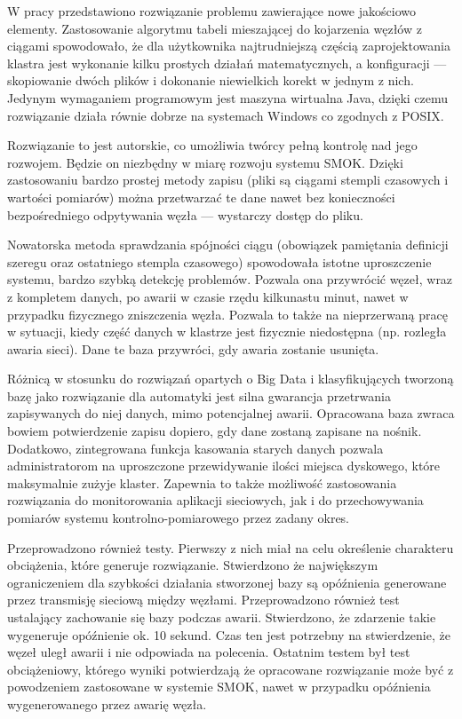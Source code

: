 \documentclass[a4paper,polish,12pt,twoside]{article}
\begin{document}
W pracy przedstawiono rozwiązanie problemu zawierające nowe jakościowo elementy. Zastosowanie algorytmu tabeli mieszającej do kojarzenia węzłów z ciągami spowodowało, że dla użytkownika najtrudniejszą częścią zaprojektowania klastra jest wykonanie kilku prostych działań matematycznych, a konfiguracji --- skopiowanie dwóch plików i dokonanie niewielkich korekt w jednym z nich. Jedynym wymaganiem programowym jest maszyna wirtualna Java, dzięki czemu rozwiązanie działa równie dobrze na systemach Windows co zgodnych z POSIX.

Rozwiązanie to jest autorskie, co umożliwia twórcy pełną kontrolę nad jego rozwojem. Będzie on niezbędny w miarę rozwoju systemu SMOK. Dzięki zastosowaniu bardzo prostej metody zapisu (pliki są ciągami stempli czasowych i wartości pomiarów) można przetwarzać te dane nawet bez konieczności bezpośredniego odpytywania węzła --- wystarczy dostęp do pliku.

Nowatorska metoda sprawdzania spójności ciągu (obowiązek pamiętania definicji szeregu oraz ostatniego stempla czasowego) spowodowała istotne uproszczenie systemu, bardzo szybką detekcję problemów. Pozwala ona przywrócić węzeł, wraz z kompletem danych, po awarii w czasie rzędu kilkunastu minut, nawet w przypadku fizycznego zniszczenia węzła. Pozwala to także na nieprzerwaną pracę w sytuacji, kiedy część danych w klastrze jest fizycznie niedostępna (np. rozległa awaria sieci). Dane te baza przywróci, gdy awaria zostanie usunięta. 

Różnicą w stosunku do rozwiązań opartych o Big Data i klasyfikujących tworzoną bazę jako rozwiązanie dla automatyki jest silna gwarancja przetrwania zapisywanych do niej danych, mimo potencjalnej awarii. Opracowana baza zwraca bowiem potwierdzenie zapisu dopiero, gdy dane zostaną zapisane na nośnik. Dodatkowo, zintegrowana funkcja kasowania starych danych pozwala administratorom na uproszczone przewidywanie ilości miejsca dyskowego, które maksymalnie zużyje klaster. Zapewnia to także możliwość zastosowania rozwiązania do monitorowania aplikacji sieciowych, jak i do przechowywania pomiarów systemu kontrolno-pomiarowego przez zadany okres.

Przeprowadzono również testy. Pierwszy z nich miał na celu określenie charakteru obciążenia, które generuje rozwiązanie. Stwierdzono że największym ograniczeniem dla szybkości działania stworzonej bazy są opóźnienia generowane przez transmisję sieciową między węzłami. Przeprowadzono również test ustalający zachowanie się bazy podczas awarii. Stwierdzono, że zdarzenie takie wygeneruje opóźnienie ok. 10 sekund. Czas ten jest potrzebny na stwierdzenie, że węzeł uległ awarii i nie odpowiada na polecenia. Ostatnim testem był test obciążeniowy, którego wyniki potwierdzają że opracowane rozwiązanie może być z powodzeniem zastosowane w systemie SMOK, nawet w przypadku opóźnienia wygenerowanego przez awarię węzła.
\end{document}
